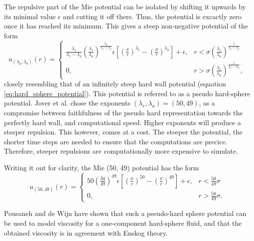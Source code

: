 The repulsive part of the Mie potential can be isolated by shifting it 
upwards by its minimal value $\epsilon$ and cutting it off there. 
Thus, the potential is excactly zero once it has reached its minimum.
This gives a steep non-negative potential of the form
\begin{equation}
    u_{(\lambda_a, \lambda_b)}(r) = 
    \begin{cases}
        \frac{\lambda_r}{\lambda_r - \lambda_a}
        \left(\frac{\lambda_r}{\lambda_a}\right)
        ^{\frac{\lambda_a}{\lambda_r - \lambda_a}}
        \epsilon \left[
            \left(\frac{\sigma}{r}\right)^{\lambda_r} -
            \left(\frac{\sigma}{r}\right)^{\lambda_a}
        \right]
        + \epsilon,
            & r < \sigma \left(
                \frac{\lambda_r}{\lambda_a}
            \right)^\frac{1}{\lambda_r - \lambda_a} \\
        0,  & r > \sigma \left(
                \frac{\lambda_r}{\lambda_a}
            \right)^\frac{1}{\lambda_r - \lambda_a},
    \end{cases}
\end{equation}
closely resembling that of an infinitely steep hard wall potential (equation \eqref{eq:hard_sphere_potential}).
This potential is referred to as a pseudo hard-sphere potential.
Jover et al. chose the exponents $(\lambda_r, \lambda_a) = (50, 49)$, 
as a compromise between faithfulness of the pseudo hard representation 
towards the perfectly hard wall, and computational speed.
Higher exponents will produce a steeper repulsion. 
This however, comes at a cost. 
The steeper the potential, the shorter time steps are needed to ensure that the computations are precice.
Therefore, steeper repulsions are computationally more expensive to simulate.

Writing it out for clarity, the Mie (50, 49) potential has the form
\begin{equation}
    u_{(50, 49)}(r) = 
    \begin{cases}
        50
        \left(\frac{50}{49}\right)
        ^{49}
        \epsilon \left[
            \left(\frac{\sigma}{r}\right)^{50} -
            \left(\frac{\sigma}{r}\right)^{49}
        \right]
        + \epsilon,
            & r < \frac{50}{49} \sigma\\
        0,  & r > \frac{50}{49} \sigma.
    \end{cases}
\end{equation}

Pousaneh and de Wijn \cite{ref:pousaneh:shear_viscosity} 
have shown that such a pseudo-hard sphere potential 
can be used to model viscosity for a one-component hard-sphere fluid, 
and that the obtained viscosity is in agreement with Enskog theory.

